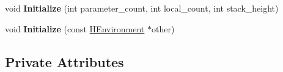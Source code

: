 \begin{DoxyCompactItemize}
\item 
void {\bfseries Initialize} (int parameter\+\_\+count, int local\+\_\+count, int stack\+\_\+height)\hypertarget{classv8_1_1internal_1_1_h_environment_a11e66e6eae564694031f39000ebdc994}{}\label{classv8_1_1internal_1_1_h_environment_a11e66e6eae564694031f39000ebdc994}

\item 
void {\bfseries Initialize} (const \hyperlink{classv8_1_1internal_1_1_h_environment}{H\+Environment} $\ast$other)\hypertarget{classv8_1_1internal_1_1_h_environment_a77f82a705e07e1424561ad206b6ebcdd}{}\label{classv8_1_1internal_1_1_h_environment_a77f82a705e07e1424561ad206b6ebcdd}

\end{DoxyCompactItemize}
\subsection*{Private Attributes}
